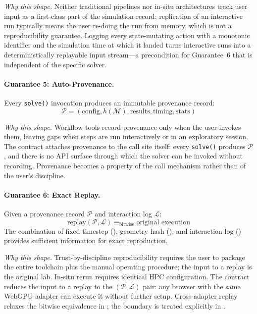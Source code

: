 \documentclass[journal]{IEEEtran}
\begin{document}
\emph{Why this shape.} Neither traditional pipelines nor in-situ
architectures track user input as a first-class part of the simulation
record; replication of an interactive run typically means the user
re-doing the run from memory, which is not a reproducibility
guarantee. Logging every state-mutating action with a monotonic
identifier and the simulation time at which it landed turns interactive
runs into a deterministically replayable input stream---a precondition
for Guarantee~6 that is independent of the specific solver.

\paragraph{Guarantee 5: Auto-Provenance.}
Every \texttt{solve()} invocation produces an immutable provenance record:
\begin{equation}
  \mathcal{P} = (\text{config}, h(\mathcal{M}),
    \text{results}, \text{timing}, \text{stats})
  \label{eq:provenance}
\end{equation}

\emph{Why this shape.} Workflow tools record provenance only when the
user invokes them, leaving gaps when steps are run interactively or
in an exploratory session. The contract attaches provenance to the
call site itself: every \texttt{solve()} produces $\mathcal{P}$, and
there is no API surface through which the solver can be invoked
without recording. Provenance becomes a property of the call
mechanism rather than of the user's discipline.

\paragraph{Guarantee 6: Exact Replay.}
Given a provenance record $\mathcal{P}$ and interaction log $\mathcal{L}$:
\begin{equation}
  \text{replay}(\mathcal{P}, \mathcal{L}) \equiv_{\text{bitwise}}
    \text{original execution}
  \label{eq:replay}
\end{equation}
The combination of fixed timestep (), geometry hash
(), and interaction log () provides
sufficient information for exact reproduction.

\emph{Why this shape.} Trust-by-discipline reproducibility requires
the user to package the entire toolchain plus the manual operating
procedure; the input to a replay is the original lab. In-situ rerun
requires identical HPC configuration. The contract reduces the input
to a replay to the $(\mathcal{P}, \mathcal{L})$ pair: any browser with
the same WebGPU adapter can execute it without further setup.
Cross-adapter replay relaxes the bitwise equivalence in
; the boundary is treated explicitly in
.
\end{document}
